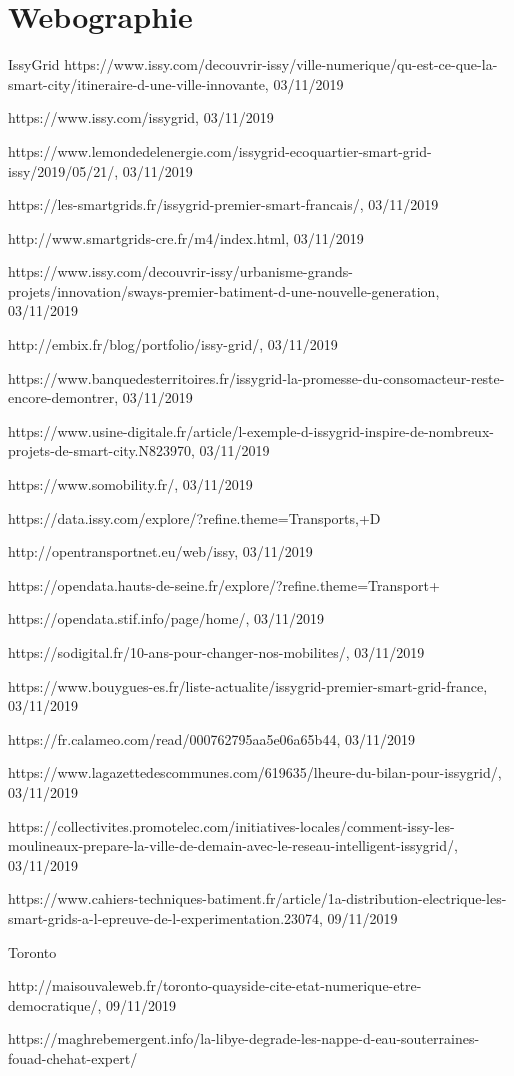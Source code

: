 \chapter*{Webographie}

IssyGrid
https://www.issy.com/decouvrir-issy/ville-numerique/qu-est-ce-que-la-smart-city/itineraire-d-une-ville-innovante, 03/11/2019

https://www.issy.com/issygrid, 03/11/2019

https://www.lemondedelenergie.com/issygrid-ecoquartier-smart-grid-issy/2019/05/21/, 03/11/2019

https://les-smartgrids.fr/issygrid-premier-smart-francais/, 03/11/2019

http://www.smartgrids-cre.fr/m4/index.html, 03/11/2019

https://www.issy.com/decouvrir-issy/urbanisme-grands-projets/innovation/sways-premier-batiment-d-une-nouvelle-generation, 03/11/2019

http://embix.fr/blog/portfolio/issy-grid/, 03/11/2019

https://www.banquedesterritoires.fr/issygrid-la-promesse-du-consomacteur-reste-encore-demontrer, 03/11/2019

https://www.usine-digitale.fr/article/l-exemple-d-issygrid-inspire-de-nombreux-projets-de-smart-city.N823970, 03/11/2019

https://www.somobility.fr/, 03/11/2019

https://data.issy.com/explore/?refine.theme=Transports,+D%

http://opentransportnet.eu/web/issy, 03/11/2019

https://opendata.hauts-de-seine.fr/explore/?refine.theme=Transport+%

https://opendata.stif.info/page/home/, 03/11/2019

https://sodigital.fr/10-ans-pour-changer-nos-mobilites/, 03/11/2019

https://www.bouygues-es.fr/liste-actualite/issygrid-premier-smart-grid-france, 03/11/2019

https://fr.calameo.com/read/000762795aa5e06a65b44, 03/11/2019

https://www.lagazettedescommunes.com/619635/lheure-du-bilan-pour-issygrid/, 03/11/2019

https://collectivites.promotelec.com/initiatives-locales/comment-issy-les-moulineaux-prepare-la-ville-de-demain-avec-le-reseau-intelligent-issygrid/, 03/11/2019

https://www.cahiers-techniques-batiment.fr/article/1a-distribution-electrique-les-smart-grids-a-l-epreuve-de-l-experimentation.23074, 09/11/2019

Toronto

http://maisouvaleweb.fr/toronto-quayside-cite-etat-numerique-etre-democratique/, 09/11/2019


https://maghrebemergent.info/la-libye-degrade-les-nappe-d-eau-souterraines-fouad-chehat-expert/